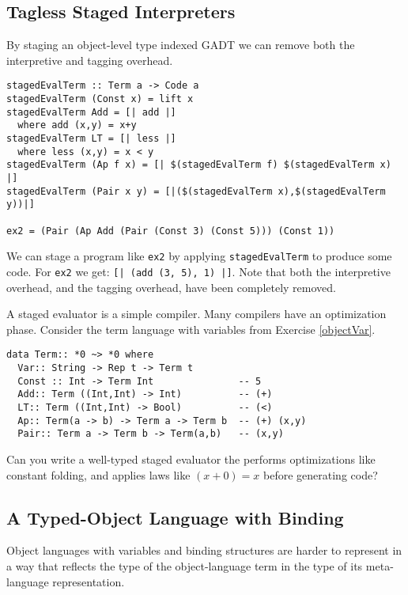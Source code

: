 \documentclass[11pt,twoside,A4]{llncs}
\begin{document}
\subsection{Tagless Staged Interpreters}

By staging an object-level type indexed GADT we can remove both
the interpretive and tagging overhead.

{\small
\begin{verbatim}
stagedEvalTerm :: Term a -> Code a
stagedEvalTerm (Const x) = lift x
stagedEvalTerm Add = [| add |]
  where add (x,y) = x+y
stagedEvalTerm LT = [| less |]
  where less (x,y) = x < y
stagedEvalTerm (Ap f x) = [| $(stagedEvalTerm f) $(stagedEvalTerm x) |]
stagedEvalTerm (Pair x y) = [|($(stagedEvalTerm x),$(stagedEvalTerm y))|]

ex2 = (Pair (Ap Add (Pair (Const 3) (Const 5))) (Const 1))
\end{verbatim}}
We can stage a program like {\tt ex2} by applying {\tt stagedEvalTerm}
to produce some code. For {\tt ex2} we get: {\tt [| (add (3, 5), 1) |]}.
Note that both the interpretive overhead, and the tagging overhead, have
been completely removed.

\begin{exercise}
A staged evaluator is a simple compiler. Many compilers
have an optimization phase. Consider the term
language with variables from Exercise \ref{objectVar}.

{\small
\begin{verbatim}
data Term:: *0 ~> *0 where
  Var:: String -> Rep t -> Term t
  Const :: Int -> Term Int               -- 5
  Add:: Term ((Int,Int) -> Int)          -- (+)
  LT:: Term ((Int,Int) -> Bool)          -- (<)
  Ap:: Term(a -> b) -> Term a -> Term b  -- (+) (x,y)
  Pair:: Term a -> Term b -> Term(a,b)   -- (x,y)
\end{verbatim}}
Can you write a well-typed staged
evaluator the performs optimizations like
constant folding, and applies laws like $(x+0) = x$
before generating code?
\end{exercise}

\subsection{A Typed-Object Language with Binding}\label{binding}

Object languages with variables and binding structures are harder
to represent in a way that reflects the type of the object-language
term in the type of its meta-language representation. 
\end{document}
